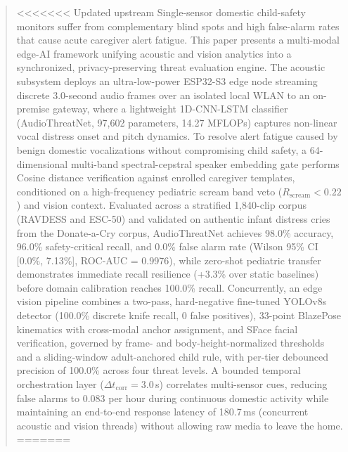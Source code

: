 \documentclass[conference]{IEEEtran}
\begin{document}
\begin{abstract}
<<<<<<< Updated upstream
Single-sensor domestic child-safety monitors suffer from complementary blind spots and high false-alarm rates that cause acute caregiver alert fatigue. This paper presents a multi-modal edge-AI framework unifying acoustic and vision analytics into a synchronized, privacy-preserving threat evaluation engine. The acoustic subsystem deploys an ultra-low-power ESP32-S3 edge node streaming discrete 3.0-second audio frames over an isolated local WLAN to an on-premise gateway, where a lightweight 1D-CNN-LSTM classifier (AudioThreatNet, 97,602 parameters, 14.27 MFLOPs) captures non-linear vocal distress onset and pitch dynamics. To resolve alert fatigue caused by benign domestic vocalizations without compromising child safety, a 64-dimensional multi-band spectral-cepstral speaker embedding gate performs Cosine distance verification against enrolled caregiver templates, conditioned on a high-frequency pediatric scream band veto ($R_{\text{scream}} < 0.22$) and vision context. Evaluated across a stratified 1,840-clip corpus (RAVDESS and ESC-50) and validated on authentic infant distress cries from the Donate-a-Cry corpus, AudioThreatNet achieves 98.0\% accuracy, 96.0\% safety-critical recall, and 0.0\% false alarm rate (Wilson 95\% CI [0.0\%, 7.13\%], ROC-AUC = 0.9976), while zero-shot pediatric transfer demonstrates immediate recall resilience (+3.3\% over static baselines) before domain calibration reaches 100.0\% recall. Concurrently, an edge vision pipeline combines a two-pass, hard-negative fine-tuned YOLOv8s detector (100.0\% discrete knife recall, 0 false positives), 33-point BlazePose kinematics with cross-modal anchor assignment, and SFace facial verification, governed by frame- and body-height-normalized thresholds and a sliding-window adult-anchored child rule, with per-tier debounced precision of 100.0\% across four threat levels. A bounded temporal orchestration layer ($\Delta t_{\text{corr}} = 3.0$\,s) correlates multi-sensor cues, reducing false alarms to 0.083 per hour during continuous domestic activity while maintaining an end-to-end response latency of 180.7\,ms (concurrent acoustic and vision threads) without allowing raw media to leave the home.
=======

\end{abstract}
\end{document}
